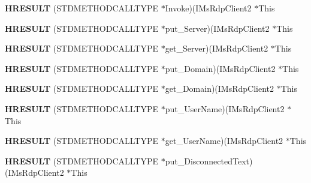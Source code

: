 \begin{DoxyCompactItemize}
\item 
\mbox{\label{struct_i_ms_rdp_client2_vtbl_a3e9c885392c5fec399e621ecca23be10}} 
{\bfseries H\+R\+E\+S\+U\+LT} (S\+T\+D\+M\+E\+T\+H\+O\+D\+C\+A\+L\+L\+T\+Y\+PE $\ast$Invoke)(I\+Ms\+Rdp\+Client2 $\ast$This
\item 
\mbox{\label{struct_i_ms_rdp_client2_vtbl_a8b1dbe83d885c0bdca5dd6167fae63e6}} 
{\bfseries H\+R\+E\+S\+U\+LT} (S\+T\+D\+M\+E\+T\+H\+O\+D\+C\+A\+L\+L\+T\+Y\+PE $\ast$put\+\_\+\+Server)(I\+Ms\+Rdp\+Client2 $\ast$This
\item 
\mbox{\label{struct_i_ms_rdp_client2_vtbl_a9326f3e77a7bee63af651918a3ebdf69}} 
{\bfseries H\+R\+E\+S\+U\+LT} (S\+T\+D\+M\+E\+T\+H\+O\+D\+C\+A\+L\+L\+T\+Y\+PE $\ast$get\+\_\+\+Server)(I\+Ms\+Rdp\+Client2 $\ast$This
\item 
\mbox{\label{struct_i_ms_rdp_client2_vtbl_a46748f1367b2f16043dbae3e1fdc7edd}} 
{\bfseries H\+R\+E\+S\+U\+LT} (S\+T\+D\+M\+E\+T\+H\+O\+D\+C\+A\+L\+L\+T\+Y\+PE $\ast$put\+\_\+\+Domain)(I\+Ms\+Rdp\+Client2 $\ast$This
\item 
\mbox{\label{struct_i_ms_rdp_client2_vtbl_a046d8317a390a6cc3ce6e4ce2872bdf6}} 
{\bfseries H\+R\+E\+S\+U\+LT} (S\+T\+D\+M\+E\+T\+H\+O\+D\+C\+A\+L\+L\+T\+Y\+PE $\ast$get\+\_\+\+Domain)(I\+Ms\+Rdp\+Client2 $\ast$This
\item 
\mbox{\label{struct_i_ms_rdp_client2_vtbl_afb8d3266f30e94f711863846011cf6c4}} 
{\bfseries H\+R\+E\+S\+U\+LT} (S\+T\+D\+M\+E\+T\+H\+O\+D\+C\+A\+L\+L\+T\+Y\+PE $\ast$put\+\_\+\+User\+Name)(I\+Ms\+Rdp\+Client2 $\ast$This
\item 
\mbox{\label{struct_i_ms_rdp_client2_vtbl_af569132693436a1b870fb52e9bb51b02}} 
{\bfseries H\+R\+E\+S\+U\+LT} (S\+T\+D\+M\+E\+T\+H\+O\+D\+C\+A\+L\+L\+T\+Y\+PE $\ast$get\+\_\+\+User\+Name)(I\+Ms\+Rdp\+Client2 $\ast$This
\item 
\mbox{\label{struct_i_ms_rdp_client2_vtbl_a663920302be9e25a641d5ed0e386273f}} 
{\bfseries H\+R\+E\+S\+U\+LT} (S\+T\+D\+M\+E\+T\+H\+O\+D\+C\+A\+L\+L\+T\+Y\+PE $\ast$put\+\_\+\+Disconnected\+Text)(I\+Ms\+Rdp\+Client2 $\ast$This

\end{DoxyCompactItemize}
